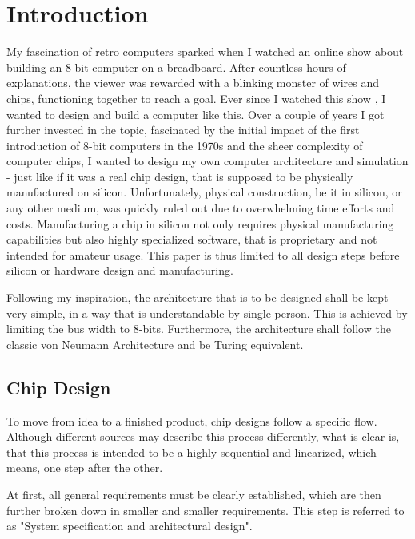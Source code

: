 \chapter{Introduction}
My fascination of retro computers sparked when I watched an online show about building an 8-bit computer on a breadboard. After countless hours of explanations, the viewer was rewarded with a blinking monster of wires and chips, functioning together to reach a goal. Ever since I watched this show \cite{beneater}, I wanted to design and build a computer like this. Over a couple of years I got further invested in the topic, fascinated by the initial impact of the first introduction of 8-bit computers in the 1970s and the sheer complexity of computer chips, I wanted to design my own computer architecture and simulation - just like if it was a real chip design, that is supposed to be physically manufactured on silicon. Unfortunately, physical construction, be it in silicon, or any other medium, was quickly ruled out due to overwhelming time efforts and costs. Manufacturing a chip in silicon not only requires physical manufacturing capabilities but also highly specialized software, that is proprietary and not intended for amateur usage. This paper is thus limited to all design steps before silicon or hardware design and manufacturing.

Following my inspiration, the architecture that is to be designed shall be kept very simple, in a way that is understandable by single person. This is achieved by limiting the bus width to 8-bits. Furthermore, the architecture shall follow the classic von Neumann Architecture and be Turing equivalent.  


\section{Chip Design} \label{sec:chip-design}
To move from idea to a finished product, chip designs follow a specific flow. Although different sources may describe this process differently, what is clear is, that this process is intended to be a highly sequential and linearized, which means, one step after the other. 

At first, all general requirements must be clearly established, which are then further broken down in smaller and smaller requirements. This step is referred to as "System specification and architectural design".

